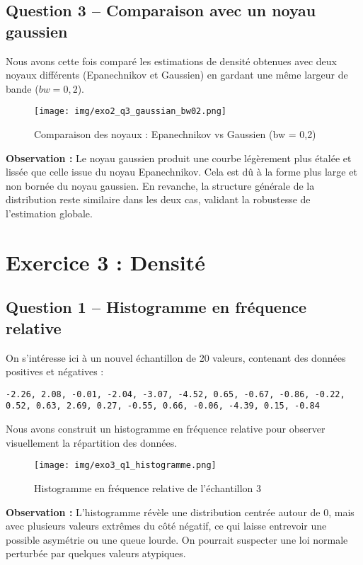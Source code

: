 \documentclass[a4paper,11pt]{article}
\begin{document}
\subsection*{Question 3 – Comparaison avec un noyau gaussien}
Nous avons cette fois comparé les estimations de densité obtenues avec deux noyaux différents (Epanechnikov et Gaussien) en gardant une même largeur de bande ($bw = 0{,}2$).

\begin{figure}[H]
    \centering
    \texttt{[image: img/exo2\_q3\_gaussian\_bw02.png]}
    \caption{Comparaison des noyaux : Epanechnikov vs Gaussien (bw = 0{,}2)}
\end{figure}

\textbf{Observation :} Le noyau gaussien produit une courbe légèrement plus étalée et lissée que celle issue du noyau Epanechnikov. Cela est dû à la forme plus large et non bornée du noyau gaussien. En revanche, la structure générale de la distribution reste similaire dans les deux cas, validant la robustesse de l’estimation globale.

\vspace{1em}

\section*{Exercice 3 : Densité}

\subsection*{Question 1 – Histogramme en fréquence relative}
On s’intéresse ici à un nouvel échantillon de 20 valeurs, contenant des données positives et négatives :

\begin{verbatim}
-2.26, 2.08, -0.01, -2.04, -3.07, -4.52, 0.65, -0.67, -0.86, -0.22,
0.52, 0.63, 2.69, 0.27, -0.55, 0.66, -0.06, -4.39, 0.15, -0.84
\end{verbatim}

Nous avons construit un histogramme en fréquence relative pour observer visuellement la répartition des données.

\begin{figure}[H]
    \centering
    \texttt{[image: img/exo3\_q1\_histogramme.png]}
    \caption{Histogramme en fréquence relative de l’échantillon 3}
\end{figure}

\textbf{Observation :} L’histogramme révèle une distribution centrée autour de 0, mais avec plusieurs valeurs extrêmes du côté négatif, ce qui laisse entrevoir une possible asymétrie ou une queue lourde. On pourrait suspecter une loi normale perturbée par quelques valeurs atypiques.
\end{document}
